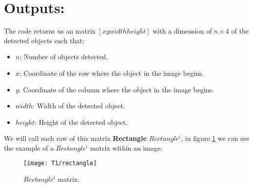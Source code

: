 \section{Outputs:}
The code returns us an matrix $[x y width height]$ with a dimension of $n\times 4$ of the detected objects such that:
\begin{itemize}
	\item $n$: Number of objects detected.
	\item $x$: Coordinate of the row where the object in the image begins.
	\item $y$: Coordinate of the column where the object in the image begins.
	\item $width$: Width of the detected object.
	\item $height$: Height of the detected object.
\end{itemize}
We will call each row of this matrix \textbf{Rectangle} $Rectangle^{i}$, in figure \ref{fig:rect} we can see the example of a $Rectangle^{i}$ matrix within an image.
\begin{figure}[h!]
	\centering
	\texttt{[image: T1/rectangle]}
	\caption{$Rectangle^{i}$ matrix.}
	\label{fig:rect}
\end{figure}
